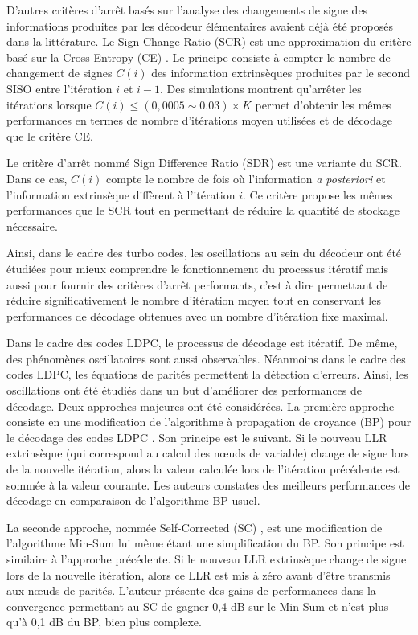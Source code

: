 D'autres critères d'arrêt basés sur l'analyse des changements de signe des informations produites par les décodeur 
élémentaires avaient déjà été proposés dans la littérature. Le Sign Change Ratio (SCR) \cite{fossorier_scr} est une 
approximation du critère basé sur la Cross Entropy (CE) \cite{hagenauer_ce}. Le principe consiste à compter le nombre de 
changement de signes $C(i)$ des information extrinsèques produites par le second SISO entre l'itération $i$ et $i-1$. 
Des simulations montrent qu'arrêter les itérations lorsque $C(i)\leq (0,0005 \sim 0.03)\times K$ permet d'obtenir les 
mêmes performances en termes de nombre d'itérations moyen utilisées et de décodage que le critère CE.

Le critère d'arrêt nommé Sign Difference Ratio (SDR) \cite{fossorier_scr} est une variante du SCR. Dans ce cas, $C(i)$ 
compte le nombre de fois où l'information \textit{a posteriori} et l'information extrinsèque diffèrent à l'itération $i$. 
Ce critère propose les mêmes performances que le SCR tout en permettant de réduire la quantité de stockage nécessaire.

Ainsi, dans le cadre des turbo codes, les oscillations au sein du décodeur ont été étudiées pour mieux comprendre le 
fonctionnement du processus itératif mais aussi pour fournir des critères d'arrêt performants, c'est à dire permettant de 
réduire significativement le nombre d'itération moyen tout en conservant les performances de décodage obtenues avec un 
nombre d'itération fixe maximal.

Dans le cadre des codes LDPC, le processus de décodage est itératif. De même, des phénomènes oscillatoires sont aussi 
observables. Néanmoins dans le cadre des codes LDPC, les équations de parités permettent la détection d'erreurs. Ainsi, 
les oscillations ont été étudiés dans un but d'améliorer des performances de décodage. Deux approches majeures ont été 
considérées. La première approche consiste en une modification de l'algorithme à propagation de croyance (BP) pour le 
décodage des codes LDPC \cite{gounai_bp_osc}. Son principe est le suivant. Si le nouveau LLR extrinsèque (qui correspond 
au calcul des nœuds de variable) change de signe lors de la nouvelle itération, alors la valeur calculée lors de 
l'itération précédente est sommée à la valeur courante. Les auteurs constates des meilleurs performances de décodage en 
comparaison de l'algorithme BP usuel.

La seconde approche, nommée Self-Corrected (SC) \cite{savin_sc}, est une modification de l'algorithme Min-Sum lui même
étant une simplification du BP. Son principe est similaire à l'approche précédente. Si le nouveau LLR extrinsèque change 
de signe lors de la nouvelle itération, alors ce LLR est mis à zéro avant d'être transmis aux nœuds de parités. L'auteur 
présente des gains de performances dans la convergence permettant au SC de gagner 0,4 dB sur le Min-Sum et n'est plus 
qu'à 0,1 dB du BP, bien plus complexe.

